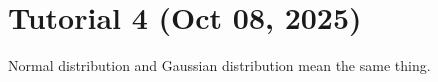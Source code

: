 \section{Tutorial 4 (Oct 08, 2025)}

Normal distribution and Gaussian distribution mean the same thing.
